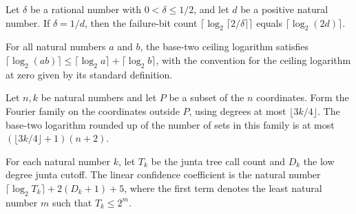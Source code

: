 \begin{theorem}
\label{FABL.fourierEstimatorFailureBits_eq_clog_two_mul_denominator}
\leanok
{}
Let $\delta$ be a rational number with $0<\delta\leq 1/2$, and let $d$ be a positive
natural number. If $\delta=1/d$, then the failure-bit count $\lceil\log_2\lceil
2/\delta\rceil\rceil$ equals $\lceil\log_2(2d)\rceil$.
\end{theorem}

\begin{theorem}
\label{FABL.lowDegreeJuntaBinaryClog_mul_le}
\leanok
{}
For all natural numbers $a$ and $b$, the base-two ceiling logarithm satisfies
$\lceil\log_2(ab)\rceil\leq \lceil\log_2 a\rceil+\lceil\log_2 b\rceil$, with the
convention for the ceiling logarithm at zero given by its standard definition.
\end{theorem}

\begin{theorem}
\label{FABL.clog_card_lowDegreeJuntaFourierFamily_le}
\leanok
{}
Let $n,k$ be natural numbers and let $P$ be a subset of the $n$ coordinates. Form the
Fourier family on the coordinates outside $P$, using degrees at most $\lfloor
3k/4\rfloor$. The base-two logarithm rounded up of the number of sets in this family is
at most $(\lfloor 3k/4\rfloor+1)(n+2)$.
\end{theorem}

\begin{definition}
\label{FABL.lowDegreeJuntaLinearConfidenceCoefficient}
\leanok
{}
For each natural number $k$, let $T_k$ be the junta tree call count and $D_k$ the low
degree junta cutoff. The linear confidence coefficient is the natural number $\lceil
\log_2 T_k\rceil + 2(D_k+1)+5$, where the first term denotes the least natural number
$m$ such that $T_k\le 2^m$.
\end{definition}

